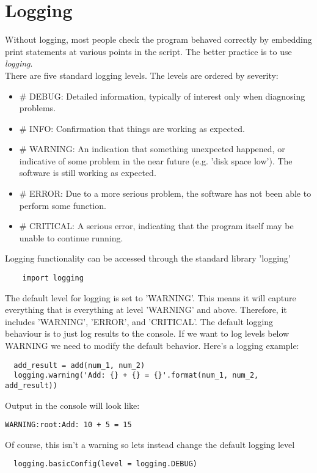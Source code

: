 \documentclass{article}%
\begin{document}
\section{Logging}
Without logging, most people check the program behaved correctly by embedding print statements at various points in the script. The better practice is to use \textit{logging}. \\

There are five standard logging levels. The levels are ordered by severity:
\begin{itemize}
  \item \# DEBUG: Detailed information, typically of interest only when diagnosing problems.
  \item \# INFO: Confirmation that things are working as expected.
  \item \# WARNING: An indication that something unexpected happened, or indicative of some problem in the near future (e.g. 'disk space low'). The software is still working as expected.
  \item \# ERROR: Due to a more serious problem, the software has not been able to perform some function.
  \item \# CRITICAL: A serious error, indicating that the program itself may be unable to continue running.
\end{itemize}
Logging functionality can be accessed through the standard library 'logging'
\begin{lstlisting}
    import logging
\end{lstlisting}
The default level for logging is set to 'WARNING'. This means it will capture everything that is everything at level 'WARNING' and above. Therefore, it includes 'WARNING', 'ERROR', and 'CRITICAL'. The default logging behaviour is to just log results to the console. If we want to log levels below WARNING we need to modify the default behavior.
Here's a logging example:
\begin{lstlisting}
  add_result = add(num_1, num_2)
  logging.warning('Add: {} + {} = {}'.format(num_1, num_2, add_result))
\end{lstlisting}
Output in the console will look like:
\begin{lstlisting}
WARNING:root:Add: 10 + 5 = 15
\end{lstlisting}
Of course, this isn't a warning so lets instead change the default logging level
\begin{lstlisting}
  logging.basicConfig(level = logging.DEBUG)
\end{lstlisting}
\end{document}
